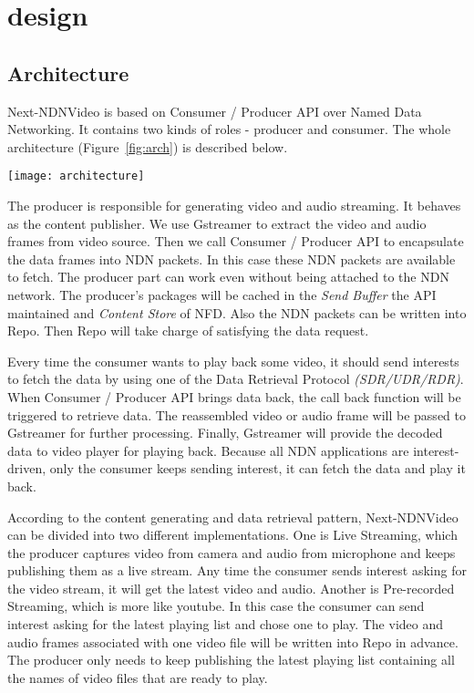 \vspace{0.3cm}
\section{design} %
\label{sec:design}
\subsection{Architecture}
Next-NDNVideo is based on Consumer / Producer API over Named Data Networking. It contains two kinds of roles - producer and consumer. The whole architecture (Figure~\ref{fig:arch}) is described below.

\begin{figure*}%
  \centering
  \texttt{[image: architecture]}
  \caption{Architecture of Next-NDNVideo}
  \label{fig:arch}
\end{figure*}

The producer is responsible for generating video and audio streaming. It behaves as the content publisher. We use Gstreamer to extract the video and audio frames from video source. Then we call Consumer / Producer API to encapsulate the data frames into NDN packets. In this case these NDN packets are available to fetch. The producer part can work even without being attached to the NDN network. The producer's packages will be cached in the \textit{Send Buffer} the API maintained and \textit{Content Store} of NFD\cite{nfd-guide}. Also the NDN packets can be written into Repo\cite{repo-ng}. Then Repo will take charge of satisfying the data request.

Every time the consumer wants to play back some video, it should send interests to fetch the data by using one of the Data Retrieval Protocol \textit{(SDR/UDR/RDR)}. When Consumer / Producer API brings data back, the call back function will be triggered to retrieve data. The reassembled video or audio frame will be passed to Gstreamer for further processing. Finally, Gstreamer will provide the decoded data to video player for playing back. Because all NDN applications are interest-driven, only the consumer keeps sending interest, it can fetch the data and play it back.

According to the content generating and data retrieval pattern, Next-NDNVideo can be divided into two different implementations. One is Live Streaming, which the producer captures video from camera and audio from microphone and keeps publishing them as a live stream. Any time the consumer sends interest asking for the video stream, it will get the latest video and audio. Another is Pre-recorded Streaming, which is more like youtube. In this case the consumer can send interest asking for the latest playing list and chose one to play. The video and audio frames associated with one video file will be written into Repo in advance. The producer only needs to keep publishing the latest playing list containing all the names of video files that are ready to play.

